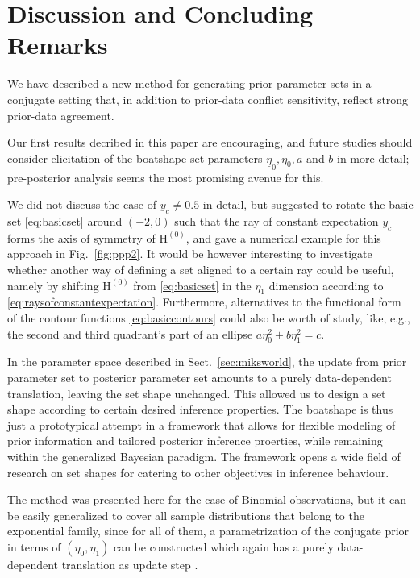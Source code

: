 \documentclass[runningheads,a4paper]{llncs}
\newcommand{\uz}{^{(0)}} %
\newcommand{\ul}[1]{\underline{#1}}
\newcommand{\ol}[1]{\overline{#1}}
\def\EZ{\mathrm{H}\uz}
\newcommand{\ez}{\eta_0}
\newcommand{\eo}{\eta_1}
\def\ezl{\ul{\eta}_0}
\def\ezu{\ol{\eta}_0}
\begin{document}
\section{Discussion and Concluding Remarks}
\label{sec:concluding}

We have described a new method for generating prior parameter sets in a conjugate setting
that, in addition to prior-data conflict sensitivity, reflect strong prior-data agreement.

Our first results decribed in this paper are encouraging,
and future studies should consider elicitation of the boatshape set parameters $\ezl, \ezu, a$ and $b$ in more detail;
pre-posterior analysis seems the most promising avenue for this.

We did not discuss the case of $y_c \neq 0.5$ in detail,
but suggested to rotate the basic set \eqref{eq:basicset} around $(-2,0)$
such that the ray of constant expectation $y_c$ forms the axis of symmetry of $\EZ$,
and gave a numerical example for this approach in Fig.~\ref{fig:ppp2}.
It would be however interesting to investigate whether another way of defining a set aligned to a certain ray could be useful,
namely by shifting $\EZ$ from \eqref{eq:basicset} in the $\eo$ dimension according to \eqref{eq:raysofconstantexpectation}.
Furthermore, alternatives to the functional form of the contour functions \eqref{eq:basiccontours} could also be worth of study,
like, e.g., the second and third quadrant's part of an ellipse $a\ez^2 + b\eo^2 = c$.

In the parameter space described in Sect.~\ref{sec:miksworld},
the update from prior parameter set to posterior parameter set
amounts to a purely data-dependent translation, leaving the set shape unchanged.
This allowed us to design a set shape according to certain desired inference properties.
The boatshape is thus just a prototypical attempt in a framework that allows
for flexible modeling of prior information and tailored posterior inference proerties,
while remaining within the generalized Bayesian paradigm.
The framework opens a wide field of research on set shapes for catering to other objectives in inference behaviour.

The method was presented here for the case of Binomial observations,
but it can be easily generalized to cover all sample distributions that belong to the exponential family,
since for all of them, a parametrization of the conjugate prior in terms of $(\ez, \eo)$ can be constructed
which again has a purely data-dependent translation as update step \cite[p.~56]{2015:mik-isipta}.





\end{document}
